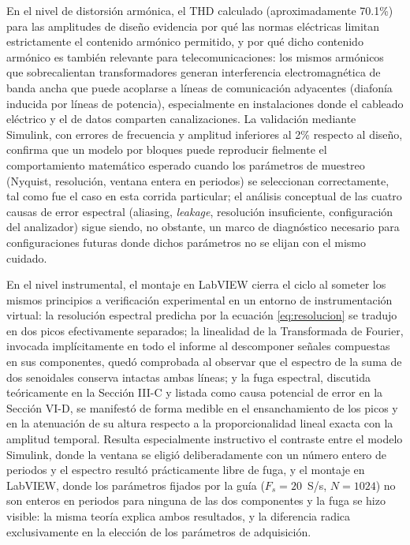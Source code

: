 \documentclass[conference]{IEEEtran}
\begin{document}
En el nivel de distorsión armónica, el THD calculado (aproximadamente 70.1\%) para las amplitudes de diseño evidencia por qué las normas eléctricas limitan estrictamente el contenido armónico permitido, y por qué dicho contenido armónico es también relevante para telecomunicaciones: los mismos armónicos que sobrecalientan transformadores generan interferencia electromagnética de banda ancha que puede acoplarse a líneas de comunicación adyacentes (diafonía inducida por líneas de potencia), especialmente en instalaciones donde el cableado eléctrico y el de datos comparten canalizaciones. La validación mediante Simulink, con errores de frecuencia y amplitud inferiores al 2\% respecto al diseño, confirma que un modelo por bloques puede reproducir fielmente el comportamiento matemático esperado cuando los parámetros de muestreo (Nyquist, resolución, ventana entera en periodos) se seleccionan correctamente, tal como fue el caso en esta corrida particular; el análisis conceptual de las cuatro causas de error espectral (aliasing, \textit{leakage}, resolución insuficiente, configuración del analizador) sigue siendo, no obstante, un marco de diagnóstico necesario para configuraciones futuras donde dichos parámetros no se elijan con el mismo cuidado.

En el nivel instrumental, el montaje en LabVIEW cierra el ciclo al someter los mismos principios a verificación experimental en un entorno de instrumentación virtual: la resolución espectral predicha por la ecuación \eqref{eq:resolucion} se tradujo en dos picos efectivamente separados; la linealidad de la Transformada de Fourier, invocada implícitamente en todo el informe al descomponer señales compuestas en sus componentes, quedó comprobada al observar que el espectro de la suma de dos senoidales conserva intactas ambas líneas; y la fuga espectral, discutida teóricamente en la Sección III-C y listada como causa potencial de error en la Sección VI-D, se manifestó de forma medible en el ensanchamiento de los picos y en la atenuación de su altura respecto a la proporcionalidad lineal exacta con la amplitud temporal. Resulta especialmente instructivo el contraste entre el modelo Simulink, donde la ventana se eligió deliberadamente con un número entero de periodos y el espectro resultó prácticamente libre de fuga, y el montaje en LabVIEW, donde los parámetros fijados por la guía ($F_s=20$~S/s, $N=1024$) no son enteros en periodos para ninguna de las dos componentes y la fuga se hizo visible: la misma teoría explica ambos resultados, y la diferencia radica exclusivamente en la elección de los parámetros de adquisición.
\end{document}
